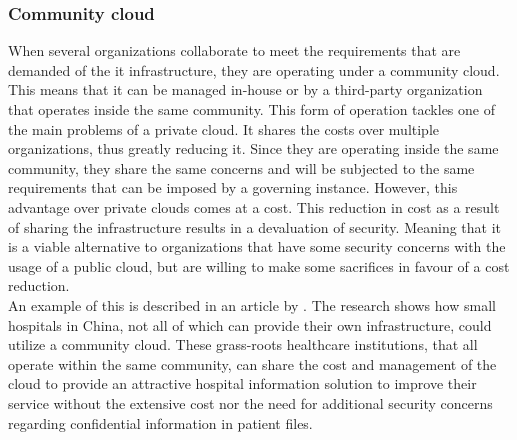 \subsubsection{Community cloud}
When several organizations collaborate to meet the requirements that are demanded of the \acrshort{it} infrastructure, they are operating under a community cloud. This means that it can be managed in-house or by a third-party organization that operates inside the same community. This form of operation tackles one of the main problems of a private cloud. It shares the costs over multiple organizations, thus greatly reducing it. Since they are operating inside the same community, they share the same concerns and will be subjected to the same requirements that can be imposed by a governing instance. 
However, this advantage over private clouds comes at a cost. This reduction in cost as a result of sharing the infrastructure results in a devaluation of security. Meaning that it is a viable alternative to organizations that have some security concerns with the usage of a public cloud, but are willing to make some sacrifices in favour of a cost reduction. 
\\
An example of this is described in an article by \textcite{Yao2014}. The research shows how small hospitals in China, not all of which can provide their own infrastructure, could utilize a community cloud. These grass-roots healthcare institutions, that all operate within the same community, can share the cost and management of the cloud to provide an attractive hospital information solution to improve their service without the extensive cost nor the need for additional security concerns regarding confidential information in patient files.

